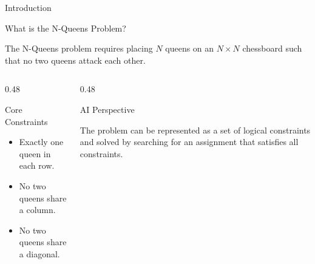\documentclass[aspectratio=169,12pt]{beamer}
\begin{document}
\begin{frame}{Introduction}

\begin{block}{What is the N-Queens Problem?}

The N-Queens problem requires placing $N$ queens on an
$N \times N$ chessboard such that no two queens attack
each other.
\end{block}

\begin{columns}[T,totalwidth=\textwidth]

\begin{column}{0.48\textwidth}

\begin{block}{Core Constraints}

\begin{itemize}
    \item Exactly one queen in each row.
    \item No two queens share a column.
    \item No two queens share a diagonal.
\end{itemize}

\end{block}

\end{column}

\begin{column}{0.48\textwidth}

\begin{exampleblock}{AI Perspective}

The problem can be represented as a set of logical
constraints and solved by searching for an assignment
that satisfies all constraints.
\end{exampleblock}

\end{column}

\end{columns}

\end{frame}

\end{document}
